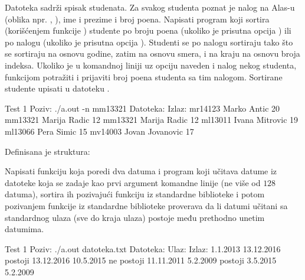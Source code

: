 \begin{Exercise}[label=524]
  Datoteka  sadrži spisak studenata. Za svakog
  studenta poznat je nalog na Alas-u (oblika npr. ,
  ), ime i prezime i broj poena. Napisati program koji
  sortira (korišćenjem funkcije ) studente po broju poena
  (ukoliko je prisutna opcija ) ili po nalogu (ukoliko je
  prisutna opcija ). Studenti se po nalogu sortiraju tako što
  se sortiraju na osnovu godine, zatim na osnovu smera, i na kraju na
  osnovu broja indeksa. Ukoliko je u komandnoj liniji uz opciju
   naveden i nalog nekog studenta, funkcijom 
  potražiti i prijaviti broj poena studenta sa tim nalogom. Sortirane
  studente upisati u datoteku .
  
\begin{maxitest}
\begin{test}{Test 1}
Poziv: ./a.out -n mm13321
Datoteka:                         Izlaz:
mr14123 Marko Antic 20            mm13321 Marija Radic 12
mm13321 Marija Radic 12
ml13011 Ivana Mitrovic 19
ml13066 Pera Simic 15
mv14003 Jovan Jovanovic 17
\end{test}
\end{maxitest}
  
\end{Exercise}

\begin{Exercise}[label=525]
  Definisana je struktura:
  \begin{ckod}
    typedef struct { int dan; int mesec; int godina; } Datum;}
  \end{ckod}
  Napisati funkciju koja poredi dva datuma i program koji učitava
  datume iz datoteke koja se zadaje kao prvi argument komandne linije
  (ne više od $128$ datuma), sortira ih pozivajući funkciju
   iz standardne biblioteke i potom pozivanjem funkcije
   iz standardne biblioteke proverava da li datumi
  učitani sa standardnog ulaza (sve do kraja ulaza) postoje među
  prethodno unetim datumima.
  
\begin{maxitest}
\begin{test}{Test 1}
Poziv: ./a.out datoteka.txt
Datoteka:            Ulaz:             Izlaz:
1.1.2013             13.12.2016        postoji
13.12.2016           10.5.2015         ne postoji
11.11.2011           5.2.2009          postoji
3.5.2015
5.2.2009
\end{test}
\end{maxitest}
  
\end{Exercise}

